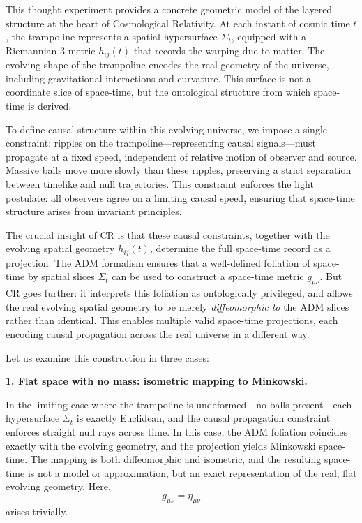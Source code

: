 \documentclass[12pt]{book}
\begin{document}
This thought experiment provides a concrete geometric model of the layered structure at the heart of Cosmological Relativity. At each instant of cosmic time $t$, the trampoline represents a spatial hypersurface $\Sigma_t$, equipped with a Riemannian 3-metric $h_{ij}(t)$ that records the warping due to matter. The evolving shape of the trampoline encodes the real geometry of the universe, including gravitational interactions and curvature. This surface is not a coordinate slice of space-time, but the ontological structure from which space-time is derived.

To define causal structure within this evolving universe, we impose a single constraint: ripples on the trampoline---representing causal signals---must propagate at a fixed speed, independent of relative motion of observer and source. Massive balls move more slowly than these ripples, preserving a strict separation between timelike and null trajectories. This constraint enforces the light postulate: all observers agree on a limiting causal speed, ensuring that space-time structure arises from invariant principles.

The crucial insight of CR is that these causal constraints, together with the evolving spatial geometry $h_{ij}(t)$, determine the full space-time record as a projection. The ADM formalism ensures that a well-defined foliation of space-time by spatial slices $\Sigma_t$ can be used to construct a space-time metric $g_{\mu\nu}$. But CR goes further: it interprets this foliation as ontologically privileged, and allows the real evolving spatial geometry to be merely \textit{diffeomorphic to} the ADM slices rather than identical. This enables multiple valid space-time projections, each encoding causal propagation across the real universe in a different way.

Let us examine this construction in three cases:

\vspace{4pt}
\noindent\textbf{1. Flat space with no mass: isometric mapping to Minkowski.}

In the limiting case where the trampoline is undeformed---no balls present---each hypersurface $\Sigma_t$ is exactly Euclidean, and the causal propagation constraint enforces straight null rays across time. In this case, the ADM foliation coincides exactly with the evolving geometry, and the projection yields Minkowski space-time. The mapping is both diffeomorphic and isometric, and the resulting space-time is not a model or approximation, but an exact representation of the real, flat evolving geometry. Here,
\[ g_{\mu\nu} = \eta_{\mu\nu} \]
arises trivially.
\end{document}
